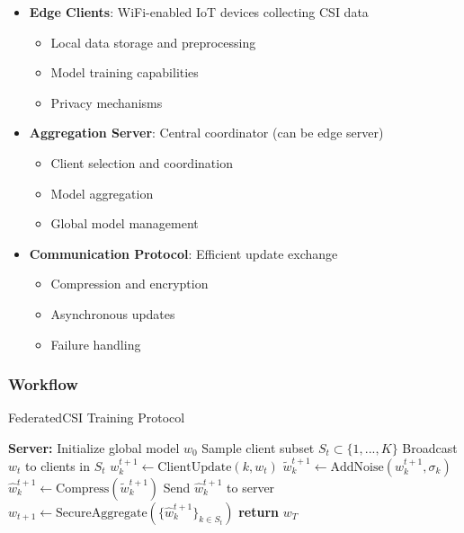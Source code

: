 \documentclass[journal]{IEEEtran}
\begin{document}
\begin{itemize}
\item \textbf{Edge Clients}: WiFi-enabled IoT devices collecting CSI data
   \begin{itemize}
   \item Local data storage and preprocessing
   \item Model training capabilities
   \item Privacy mechanisms
   \end{itemize}
   
\item \textbf{Aggregation Server}: Central coordinator (can be edge server)
   \begin{itemize}
   \item Client selection and coordination
   \item Model aggregation
   \item Global model management
   \end{itemize}
   
\item \textbf{Communication Protocol}: Efficient update exchange
   \begin{itemize}
   \item Compression and encryption
   \item Asynchronous updates
   \item Failure handling
   \end{itemize}
\end{itemize}

\subsubsection{Workflow}
\begin{algorithm}
\caption{FederatedCSI Training Protocol}
\label{alg:fedcsi}
\begin{algorithmic}[1]
\STATE \textbf{Server:} Initialize global model $w_0$
    \STATE Sample client subset $S_t \subset \{1,...,K\}$
    \STATE Broadcast $w_t$ to clients in $S_t$
        \STATE $w_k^{t+1} \leftarrow \text{ClientUpdate}(k, w_t)$
        \STATE $\tilde{w}_k^{t+1} \leftarrow \text{AddNoise}(w_k^{t+1}, \sigma_k)$
        \STATE $\hat{w}_k^{t+1} \leftarrow \text{Compress}(\tilde{w}_k^{t+1})$
        \STATE Send $\hat{w}_k^{t+1}$ to server
    \ENDFOR
    \STATE $w_{t+1} \leftarrow \text{SecureAggregate}(\{\hat{w}_k^{t+1}\}_{k \in S_t})$
\ENDFOR
\STATE \textbf{return} $w_T$
\end{algorithmic}
\end{algorithm}
\end{document}
